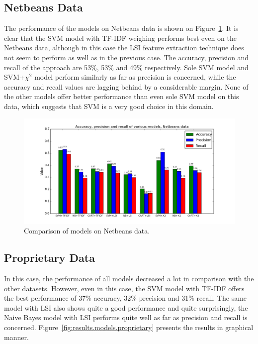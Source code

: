 \subsection{Netbeans Data}

The performance of the models on Netbeans data is shown on Figure~\ref{fig:results.models.netbeans}. It is clear that the SVM model with TF-IDF weighing performs best even on the Netbeans data, although in this case the LSI feature extraction technique does not seem to perform as well as in the previous case. The accuracy, precision and recall of the approach are 53\%, 53\% and 49\% respectively. Sole SVM model and SVM+$\chi^2$ model perform similarly as far as precision is concerned, while the accuracy and recall values are lagging behind by a considerable margin. None of the other models offer better performance than even sole SVM model on this data, which suggests that SVM is a very good choice in this domain.

\begin{figure}[htbp]
    \centering
        \includegraphics[width=\textwidth]{./images/comparison_of_models/netbeans.png}
    \caption{Comparison of models on Netbeans data.}
    \label{fig:results.models.netbeans}
\end{figure}

\subsection{Proprietary Data}

In this case, the performance of all models decreased a lot in comparison with the other datasets. However, even in this case, the SVM model with TF-IDF offers the best performance of 37\% accuracy, 32\% precision and 31\% recall. The same model with LSI also shows quite a good performance and quite surprisingly, the Naive Bayes model with LSI performs quite well as far as precision and recall is concerned. Figure~\ref{fig:results.models.proprietary} presents the results in graphical manner.

